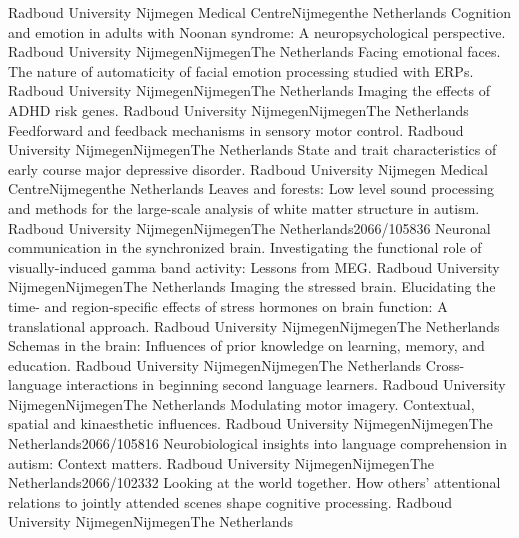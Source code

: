 	{Radboud University Nijmegen Medical Centre}{Nijmegen}{the Netherlands}{}
	{Cognition and emotion in adults with Noonan syndrome: A neuropsychological perspective.}
	{Radboud University Nijmegen}{Nijmegen}{The Netherlands}{}
	{Facing emotional faces. The nature of automaticity of facial emotion processing studied with ERPs.}
	{Radboud University Nijmegen}{Nijmegen}{The Netherlands}{}
	{Imaging the effects of ADHD risk genes.}
	{Radboud University Nijmegen}{Nijmegen}{The Netherlands}{}
	{Feedforward and feedback mechanisms in sensory motor control.}
	{Radboud University Nijmegen}{Nijmegen}{The Netherlands}{}
	{State and trait characteristics of early course major depressive disorder.}
	{Radboud University Nijmegen Medical Centre}{Nijmegen}{the Netherlands}{}
	{Leaves and forests: Low level sound processing and methods for the large-scale analysis of white matter structure in autism.}
	{Radboud University Nijmegen}{Nijmegen}{The Netherlands}{2066/105836}
	{Neuronal communication in the synchronized brain. Investigating the functional role of visually-induced gamma band activity: Lessons from MEG.}
	{Radboud University Nijmegen}{Nijmegen}{The Netherlands}{}
	{Imaging the stressed brain. Elucidating the time- and region-specific effects of stress hormones on brain function: A translational approach.}
	{Radboud University Nijmegen}{Nijmegen}{The Netherlands}{}
	{Schemas in the brain: Influences of prior knowledge on learning, memory, and education.}
	{Radboud University Nijmegen}{Nijmegen}{The Netherlands}{}
	{Cross-language interactions in beginning second language learners.}
	{Radboud University Nijmegen}{Nijmegen}{The Netherlands}{}
	{Modulating motor imagery. Contextual, spatial and kinaesthetic influences.}
	{Radboud University Nijmegen}{Nijmegen}{The Netherlands}{2066/105816}
	{Neurobiological insights into language comprehension in autism: Context matters.}
	{Radboud University Nijmegen}{Nijmegen}{The Netherlands}{2066/102332}
	{Looking at the world together. How others’ attentional relations to jointly attended scenes shape cognitive processing.}
	{Radboud University Nijmegen}{Nijmegen}{The Netherlands}{}

